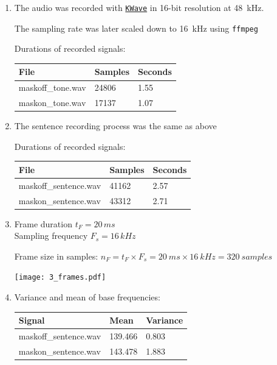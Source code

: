 \documentclass[a4paper, 11pt]{article}
\begin{document}
	\begin{enumerate}
		\item
		The audio was recorded with \texttt{\href{https://apps.kde.org/en/kwave}{KWave}} in 16-bit resolution at 48~kHz.

		The sampling rate was later scaled down to 16~kHz using \texttt{ffmpeg}

		Durations of recorded signals: \\
		\begin{tabular}{ | l | l | l | }
			\hline
			\textbf{File} & \textbf{Samples} & \textbf{Seconds} \\ \hline
			maskoff\_tone.wav & 24806            & 1.55             \\ \hline
			maskon\_tone.wav  & 17137            & 1.07             \\ \hline
		\end{tabular}

		\item
		The sentence recording process was the same as above

		Durations of recorded signals: \\
		\begin{tabular}{ | l | l | l | }
			\hline
			\textbf{File}     & \textbf{Samples} & \textbf{Seconds} \\ \hline
			maskoff\_sentence.wav & 41162            & 2.57             \\ \hline
			maskon\_sentence.wav  & 43312            & 2.71             \\ \hline
		\end{tabular}

		\item
		Frame duration $t_F = 20\,ms$ \\
		Sampling frequency $F_s = 16\,kHz$

		Frame size in samples: $n_F = t_F \times F_s = 20~ms \times 16~kHz = 320~samples$

		\texttt{[image: 3\_frames.pdf]}

		\item
		Variance and mean of base frequencies: \\
		\begin{tabular}{ | l | l | l | }
			\hline
			\textbf{Signal}   & \textbf{Mean} & \textbf{Variance} \\ \hline
			maskoff\_sentence.wav & 139.466       & 0.803             \\ \hline
			maskon\_sentence.wav  & 143.478       & 1.883             \\ \hline
		\end{tabular}


\end{enumerate}
\end{document}
